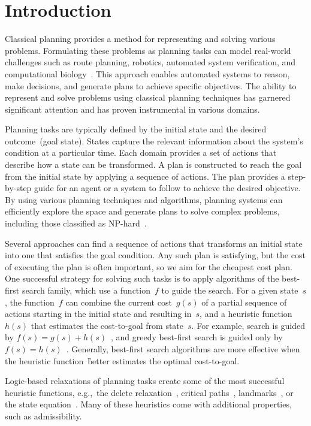 \chapter{Introduction}
\label{chapter:introduction}

Classical planning provides a method for representing and solving various problems. Formulating these problems as planning tasks can model real-world challenges such as route planning, robotics, automated system verification, and computational biology~\cite{Edelkamp.etal/2012}. This approach enables automated systems to reason, make decisions, and generate plans to achieve specific objectives. The ability to represent and solve problems using classical planning techniques has garnered significant attention and has proven instrumental in various domains.

Planning tasks are typically defined by the initial state and the desired outcome~(goal state). States capture the relevant information about the system's condition at a particular time. Each domain provides a set of actions that describe how a state can be transformed. A plan is constructed to reach the goal from the initial state by applying a sequence of actions. The plan provides a step-by-step guide for an agent or a system to follow to achieve the desired objective. By using various planning techniques and algorithms, planning systems can efficiently explore the space and generate plans to solve complex problems, including those classified as NP-hard~\cite{bylander1994computational}.

Several approaches can find a sequence of actions that transforms an initial state into one that satisfies the goal condition. Any such plan is satisfying, but the cost of executing the plan is often important, so we aim for the cheapest cost plan. One successful strategy for solving such tasks is to apply algorithms of the best-first search family, which use a function~$f$ to guide the search. For a given state~$s$, the function~$f$ can combine the current cost~$g(s)$ of a partial sequence of actions starting in the initial state and resulting in~$s$, and a heuristic function~$h(s)$ that estimates the cost-to-goal from state~$s$. For example, \astar search is guided by $f(s)=g(s)+h(s)$~\cite{hart-et-al-ieeessc1968}, and greedy best-first search is guided only by $f(s)=h(s)$~\cite{doran-michie-rsl1966}. Generally, best-first search algorithms are more effective when the heuristic function~\h better estimates the optimal cost-to-goal.

Logic-based relaxations of planning tasks create some of the most successful heuristic functions, e.g.,~the delete relaxation~\cite{Hoffmann.Nebel/2001}, critical paths~\cite{haslum-geffner-aips2000}, landmarks~\cite{hoffmann-et-al-jair2004,Karpas.Domshlak/2009}, or the state equation~\cite{bonet-ijcai2013}. Many of these heuristics come with additional properties, such as admissibility.

